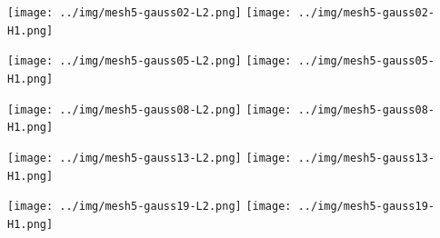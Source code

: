 \documentclass[
  11pt,
]{article}
\let\origfigure\figure
\let\endorigfigure\endfigure
\renewenvironment{figure}[1][2] {
    \expandafter\origfigure\expandafter[H]
} {
    \endorigfigure
}
\begin{document}
\begin{figure}
\caption{Finite element error in the L2 and H1 norms/seminorms, respectively for problem 1 over mesh number 4 using order 19 quadrature.}
\end{figure}

\texttt{[image: ../img/mesh5-gauss02-L2.png]}
\texttt{[image: ../img/mesh5-gauss02-H1.png]}

\begin{figure}
\caption{Finite element error in the L2 and H1 norms/seminorms, respectively for problem 1 over mesh number 5 using order 2 quadrature.}
\end{figure}

\texttt{[image: ../img/mesh5-gauss05-L2.png]}
\texttt{[image: ../img/mesh5-gauss05-H1.png]}

\begin{figure}
\caption{Finite element error in the L2 and H1 norms/seminorms, respectively for problem 1 over mesh number 5 using order 5 quadrature.}
\end{figure}

\texttt{[image: ../img/mesh5-gauss08-L2.png]}
\texttt{[image: ../img/mesh5-gauss08-H1.png]}

\begin{figure}
\caption{Finite element error in the L2 and H1 norms/seminorms, respectively for problem 1 over mesh number 5 using order 8 quadrature.}
\end{figure}

\texttt{[image: ../img/mesh5-gauss13-L2.png]}
\texttt{[image: ../img/mesh5-gauss13-H1.png]}

\begin{figure}
\caption{Finite element error in the L2 and H1 norms/seminorms, respectively for problem 1 over mesh number 5 using order 13 quadrature.}
\end{figure}

\texttt{[image: ../img/mesh5-gauss19-L2.png]}
\texttt{[image: ../img/mesh5-gauss19-H1.png]}

\begin{figure}
\caption{Finite element error in the L2 and H1 norms/seminorms, respectively for problem 1 over mesh number 5 using order 19 quadrature.}
\end{figure}
\end{document}
